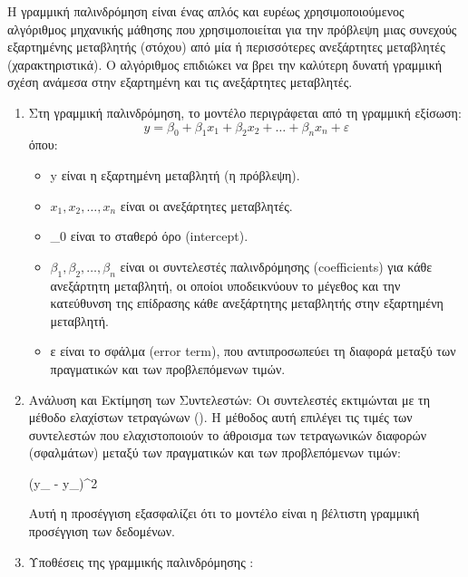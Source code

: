 \documentclass[diploma]{softlab-thesis}
\begin{document}
Η γραμμική παλινδρόμηση είναι ένας απλός και ευρέως χρησιμοποιούμενος αλγόριθμος μηχανικής μάθησης που χρησιμοποιείται για την πρόβλεψη μιας συνεχούς εξαρτημένης μεταβλητής (στόχου) από μία ή περισσότερες ανεξάρτητες μεταβλητές (χαρακτηριστικά). Ο αλγόριθμος επιδιώκει να βρει την καλύτερη δυνατή γραμμική σχέση ανάμεσα στην εξαρτημένη και τις ανεξάρτητες μεταβλητές.
\begin{enumerate}
\item Στη γραμμική παλινδρόμηση, το μοντέλο περιγράφεται από τη γραμμική εξίσωση:
\[
y = \beta_0 + \beta_1 x_1 + \beta_2 x_2 + \dots + \beta_n x_n + \varepsilon
\]
όπου: 
\begin{itemize}
\item y  είναι η εξαρτημένη μεταβλητή (η πρόβλεψη).
\item \( x_1, x_2, \dots, x_n \) είναι οι ανεξάρτητες μεταβλητές.
\item \beta_0  είναι το σταθερό όρο (intercept).
\item \( \beta_1, \beta_2, \dots, \beta_n \) είναι οι συντελεστές παλινδρόμησης (coefficients) για κάθε ανεξάρτητη μεταβλητή, οι οποίοι υποδεικνύουν το μέγεθος και την κατεύθυνση της επίδρασης κάθε ανεξάρτητης μεταβλητής στην εξαρτημένη μεταβλητή.
\item ε είναι το σφάλμα (error term), που αντιπροσωπεύει τη διαφορά μεταξύ των πραγματικών και των προβλεπόμενων τιμών.
\end{itemize}

\item Ανάλυση και Εκτίμηση των Συντελεστών: Οι συντελεστές εκτιμώνται με τη μέθοδο ελαχίστων τετραγώνων (). Η μέθοδος αυτή επιλέγει τις τιμές των συντελεστών που ελαχιστοποιούν το άθροισμα των τετραγωνικών διαφορών (σφαλμάτων) μεταξύ των πραγματικών και των προβλεπόμενων τιμών:

 \sum (y_{} - y_{})^2

Αυτή η προσέγγιση εξασφαλίζει ότι το μοντέλο είναι η βέλτιστη γραμμική προσέγγιση των δεδομένων.

\item Υποθέσεις της γραμμικής παλινδρόμησης :
\begin{enumerate}


\end{enumerate}
\end{enumerate}
\end{document}
